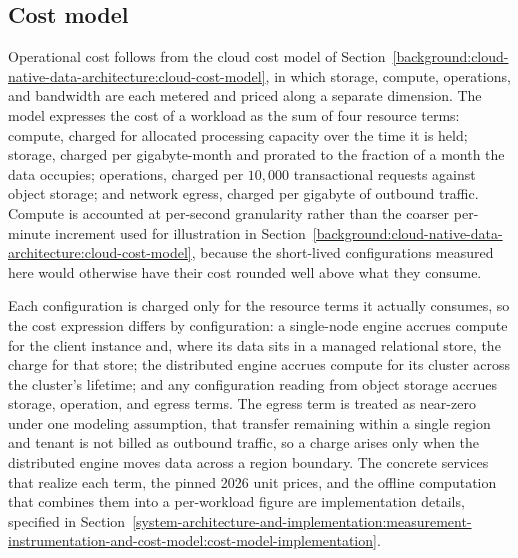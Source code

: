 \subsection{Cost model}
\label{research-design-and-methodology:metrics-and-cost-model:cost-model}

Operational cost follows from the cloud cost model of Section~\ref{background:cloud-native-data-architecture:cloud-cost-model}, in which storage, compute, operations, and bandwidth are each metered and priced along a separate dimension. The model expresses the cost of a workload as the sum of four resource terms: compute, charged for allocated processing capacity over the time it is held; storage, charged per gigabyte-month and prorated to the fraction of a month the data occupies; operations, charged per $10{,}000$ transactional requests against object storage; and network egress, charged per gigabyte of outbound traffic. Compute is accounted at per-second granularity rather than the coarser per-minute increment used for illustration in Section~\ref{background:cloud-native-data-architecture:cloud-cost-model}, because the short-lived configurations measured here would otherwise have their cost rounded well above what they consume.

Each configuration is charged only for the resource terms it actually consumes, so the cost expression differs by configuration: a single-node engine accrues compute for the client instance and, where its data sits in a managed relational store, the charge for that store; the distributed engine accrues compute for its cluster across the cluster's lifetime; and any configuration reading from object storage accrues storage, operation, and egress terms. The egress term is treated as near-zero under one modeling assumption, that transfer remaining within a single region and tenant is not billed as outbound traffic, so a charge arises only when the distributed engine moves data across a region boundary. The concrete services that realize each term, the pinned 2026 unit prices, and the offline computation that combines them into a per-workload figure are implementation details, specified in Section~\ref{system-architecture-and-implementation:measurement-instrumentation-and-cost-model:cost-model-implementation}.